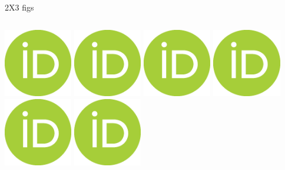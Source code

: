 \documentclass{beamer}
\begin{document}
\begin{frame}{2X3 figs}
    \begin{columns}[t]
        \includegraphics[width=\columnwidth,height=3cm]{figs/ORCIDiD_icon.png}
        \includegraphics[width=\columnwidth,height=3cm]{figs/ORCIDiD_icon.png}
        \includegraphics[width=\columnwidth,height=3cm]{figs/ORCIDiD_icon.png}
        \includegraphics[width=\columnwidth,height=3cm]{figs/ORCIDiD_icon.png}
        \includegraphics[width=\columnwidth,height=3cm]{figs/ORCIDiD_icon.png}
        \includegraphics[width=\columnwidth,height=3cm]{figs/ORCIDiD_icon.png}
    \end{columns}
\end{frame}
\end{document}

